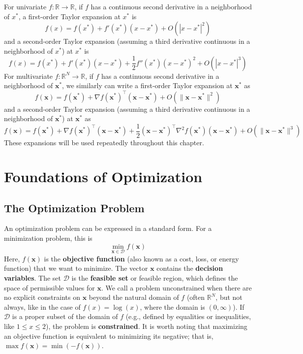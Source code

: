 For univariate $f: \mathbb{R} \to \mathbb{R}$, if $f$ has a continuous second derivative in a neighborhood of $x^*$, a first-order Taylor expansion at $x^*$ is
\begin{equation}
    f(x) = f(x^*) + f'(x^*)(x-x^*) + O(|x-x^*|^2)
\end{equation}
and a second-order Taylor expansion (assuming a third derivative continuous in a neighborhood of $x^*$) at $x^*$ is
\begin{equation}
    f(x) = f(x^*) + f'(x^*)(x-x^*) + \frac{1}{2} f''(x^*)(x-x^*)^2 + O(|x-x^*|^3)
\end{equation}
For multivariate $f: \mathbb{R}^N \to \mathbb{R}$, if $f$ has a continuous second derivative in a neighborhood of $\mathbf{x}^*$, we similarly can write a first-order Taylor expansion at $\mathbf{x}^*$ as
\begin{equation}
    f(\mathbf{x}) = f(\mathbf{x}^*) + \nabla f(\mathbf{x}^*)^\top(\mathbf{x}-\mathbf{x}^*) + O(\|\mathbf{x}-\mathbf{x}^*\|^2)
\end{equation}
and a second-order Taylor expansion (assuming a third derivative continuous in a neighborhood of $\mathbf{x}^*$) at $\mathbf{x}^*$ as
\begin{equation}
    f(\mathbf{x}) = f(\mathbf{x}^*) + \nabla f(\mathbf{x}^*)^\top(\mathbf{x}-\mathbf{x}^*) + \frac{1}{2} (\mathbf{x}-\mathbf{x}^*)^\top \nabla^2 f(\mathbf{x}^*) (\mathbf{x}-\mathbf{x}^*) + O(\|\mathbf{x}-\mathbf{x}^*\|^3)
\end{equation}
These expansions will be used repeatedly throughout this chapter.

\section{Foundations of Optimization}
\subsection{The Optimization Problem}
An optimization problem can be expressed in a standard form. For a minimization problem, this is
\begin{equation}
    \min_{\mathbf{x} \in \mathcal{D}} f(\mathbf{x})
\end{equation}
Here, $f(\mathbf{x})$ is the \textbf{objective function} (also known as a cost, loss, or energy function) that we want to minimize. The vector $\mathbf{x}$ contains the \textbf{decision variables}. The set $\mathcal{D}$ is the \textbf{feasible set} or feasible region, which defines the space of permissible values for $\mathbf{x}$. We call a problem unconstrained when there are no explicit constraints on $\mathbf{x}$ beyond the natural domain of $f$ (often $\mathbb{R}^N$, but not always, like in the case of $f(x) = \log(x)$, where the domain is $(0,\infty)$). If $\mathcal{D}$ is a proper subset of the domain of $f$ (e.g., defined by equalities or inequalities, like $1 \le x \le 2$), the problem is \textbf{constrained}. It is worth noting that maximizing an objective function is equivalent to minimizing its negative; that is, $\max f(\mathbf{x}) = \min\left( -f(\mathbf{x}) \right)$.

